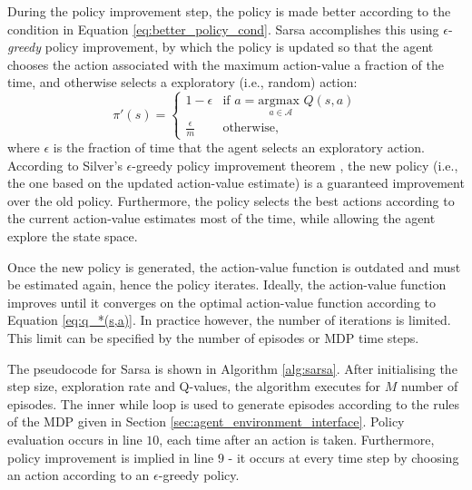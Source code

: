 During the policy improvement step, the policy is made better according to the condition in Equation \ref{eq:better_policy_cond}.
Sarsa accomplishes this using $\epsilon$-\emph{greedy} policy improvement, by which the policy is updated so that the agent chooses the action associated with the maximum action-value a fraction of the time, and otherwise selects a exploratory (i.e., random) action: 
\begin{equation}
    \pi'(s) = 
    \begin{cases}
    1-\epsilon & \text{if } a = \underset{a \in \mathcal{A}}{\text{argmax }} Q(s,a) \\
    \frac{\epsilon}{m} & \text{otherwise,}
    \end{cases}
\end{equation}
where $\epsilon$ is the fraction of time that the agent selects an exploratory action.
According to Silver's  $\epsilon$-greedy policy improvement theorem \cite{silver2015}, the new policy (i.e., the one based on the updated action-value estimate) is a guaranteed improvement over the old policy.
Furthermore, the policy selects the best actions according to the current action-value estimates most of the time, while allowing the agent explore the state space.

Once the new policy is generated, the action-value function is outdated and must be estimated again,
hence the policy iterates. 
Ideally, the action-value function improves until it converges on the optimal action-value function according to Equation \ref{eq:q_*(s,a)}.
In practice however, the number of iterations is limited. 
This limit can be specified by the number of episodes or MDP time steps.

The pseudocode for Sarsa is shown in Algorithm \ref{alg:sarsa}.
After initialising the step size, exploration rate and Q-values, the algorithm executes for $M$ number of episodes.
The inner while loop is used to generate episodes according to the rules of the MDP given in Section \ref{sec:agent_environment_interface}.
Policy evaluation occurs in line $10$, each time after an action is taken.
Furthermore, policy improvement is implied in line $9$ - it occurs at every time step by choosing an action according to an $\epsilon$-greedy policy. 

